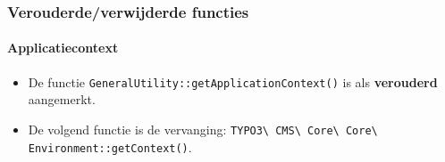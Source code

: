 
\begin{frame}[fragile]
	\frametitle{Verouderde/verwijderde functies}
	\framesubtitle{Applicatiecontext}

	\lstset{basicstyle=\tiny\ttfamily}

	\begin{itemize}
		\item De functie \texttt{GeneralUtility::getApplicationContext()} is als \textbf{verouderd} aangemerkt.
		\item De volgend functie is de vervanging:\newline
		 	\texttt{TYPO3\textbackslash
				CMS\textbackslash
				Core\textbackslash
				Core\textbackslash
				Environment::getContext()}.

	\end{itemize}

\end{frame}


